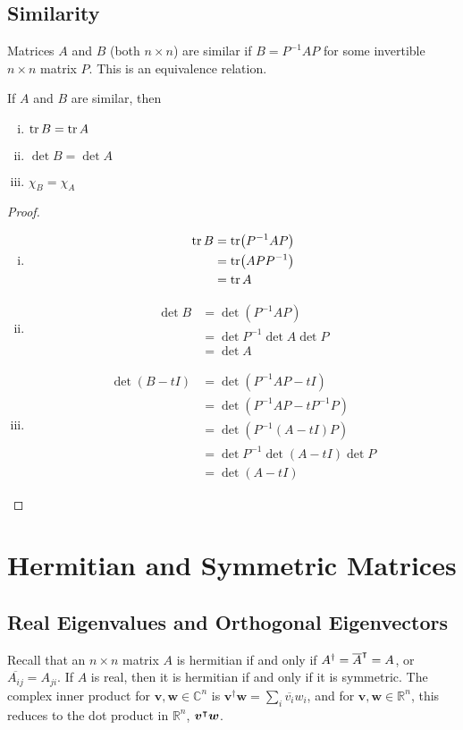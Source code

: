 \documentclass{article}
\begin{document}
\subsection{Similarity}
Matrices $A$ and $B$ (both $n \times n$) are similar if $B = P^{-1}AP$ for some invertible $n\times n$ matrix $P$. This is an equivalence relation.
\begin{proposition}
	If $A$ and $B$ are similar, then
	\begin{enumerate}[(i)]
		\item $\tr B = \tr A$
		\item $\det B = \det A$
		\item $\chi_B = \chi_A$
	\end{enumerate}
\end{proposition}
\begin{proof}
	\begin{enumerate}[(i)]
		\item \begin{align*}
			      \tr B & = \tr (P^{-1}AP) \\&= \tr(APP^{-1}) \\&= \tr A
		      \end{align*}
		\item \begin{align*}
			      \det B & = \det (P^{-1}AP) \\&= \det P^{-1} \det A \det P \\&= \det A
		      \end{align*}
		\item \begin{align*}
			      \det(B - tI) & = \det(P^{-1}AP - tI) \\&= \det(P^{-1}AP - tP^{-1}P) \\&= \det(P^{-1}(A - tI)P) \\&= \det P^{-1} \det(A - tI) \det P \\&= \det(A - tI)
		      \end{align*}
	\end{enumerate}
\end{proof}

\section{Hermitian and Symmetric Matrices}
\subsection{Real Eigenvalues and Orthogonal Eigenvectors}
Recall that an $n\times n$ matrix $A$ is hermitian if and only if $A^\dagger = \overline{A}^\intercal = A$, or $\overline{A_{ij}} = A_{ji}$. If $A$ is real, then it is hermitian if and only if it is symmetric. The complex inner product for $\bm v, \bm w \in \mathbb C^n$ is $\bm v^\dagger \bm w = \sum_i \overline{v_i}w_i$, and for $\bm v, \bm w \in \mathbb R^n$, this reduces to the dot product in $\mathbb R^n$, $\bm v^\intercal \bm w$.
\end{document}
